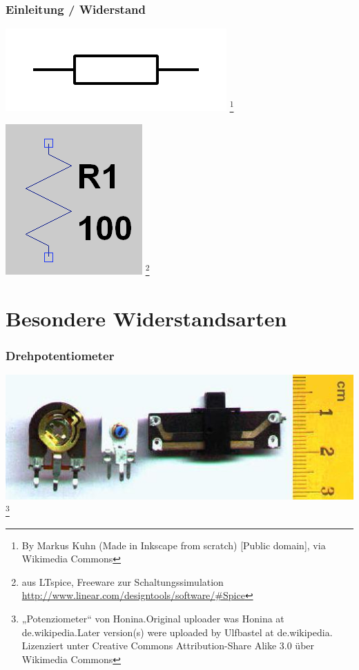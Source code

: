 \begin{frame}
    \frametitle{Einleitung / Widerstand}

    \begin{center}
        \includegraphics[width=.4\textwidth]{e04/Resistor_symbol_IEC.png}
        \footnote{\tiny By Markus Kuhn (Made in Inkscape from scratch) [Public domain], via Wikimedia Commons}
    \end{center}

    \begin{center}
        \includegraphics[width=.4\textwidth]{e04/R_LTspice.png}
        \footnote{\tiny aus LTspice, Freeware zur Schaltungssimulation \url{http://www.linear.com/designtools/software/\#Spice}}
    \end{center}
 	
\end{frame}

\section*{Besondere Widerstandsarten}
\begin{frame}
    \frametitle{Drehpotentiometer}

    \begin{center}
        \includegraphics[width=.5\textwidth]{e04/Potenziometer.jpg}
        \footnote{\tiny „Potenziometer“ von Honina.Original uploader was Honina at de.wikipedia.Later version(s) were uploaded by Ulfbastel at de.wikipedia. Lizenziert unter Creative Commons Attribution-Share Alike 3.0 über Wikimedia Commons}
    \end{center}
 	
\end{frame}

